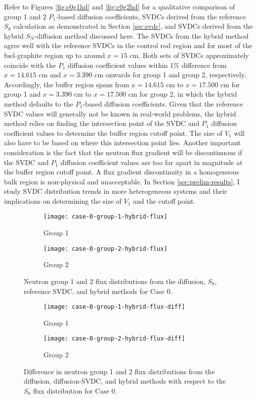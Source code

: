 Refer to Figures \ref{fig:c0g1hd} and \ref{fig:c0g2hd} for a qualitative comparison of group 1 and
2 $P_1$-based diffusion coefficients, \glspl{SVDC} derived from the reference $S_8$ calculation as
demonstrated in Section \ref{sec:svdc}, and \glspl{SVDC} derived from the hybrid $S_N$-diffusion
method discussed here. The \glspl{SVDC} from the hybrid method agree well with the reference
\glspl{SVDC} in the control rod region and for most of the fuel-graphite region up to around
$x=15$ cm. Both sets of \glspl{SVDC} approximately coincide with the $P_1$ diffusion coefficient
values within 1\% difference from $x=14.615$ cm and $x=3.390$ cm onwards for group 1 and
group 2, respectively. Accordingly, the buffer region spans from $x=14.615$ cm to $x=17.500$ cm for
group 1 and $x=3.390$ cm to $x=17.500$ cm for group 2, in which the hybrid method defaults to the
$P_1$-based diffusion coefficients. Given that the reference \gls{SVDC} values will generally not
be known in real-world problems, the hybrid method relies on finding the intersection point of the
\gls{SVDC} and $P_1$ diffusion coefficient values to determine the buffer region cutoff point. The
size of $V_1$ will also have to be based on where this intersection point lies.
Another important consideration is the fact that the neutron flux gradient will be discontinuous if
the \gls{SVDC} and $P_1$ diffusion coefficient values are too far apart in magnitude at the buffer
region cutoff point. A flux gradient discontinuity in a homogeneous bulk region is non-physical and
unacceptable. In Section \ref{sec:prelim-results}, I study \gls{SVDC} distribution trends
in more heterogeneous systems and their implications on determining the size of $V_1$ and
the cutoff point.
%
\begin{figure}[htb!]
  \centering
  \begin{subfigure}[b]{.49\textwidth}
    \centering
    \texttt{[image: case-0-group-1-hybrid-flux]}
    \caption{Group 1}
    \label{fig:c0g1hf}
  \end{subfigure}
  \hfill
  \begin{subfigure}[b]{.49\textwidth}
    \centering
    \texttt{[image: case-0-group-2-hybrid-flux]}
    \caption{Group 2}
    \label{fig:c0g2hf}
  \end{subfigure}
  \caption{Neutron group 1 and 2 flux distributions from the diffusion, $S_8$, reference
  \gls{SVDC}, and hybrid methods for Case 0.}
  \label{fig:c0hf}
  \centering
  \begin{subfigure}[b]{.49\textwidth}
    \centering
    \texttt{[image: case-0-group-1-hybrid-flux-diff]}
    \caption{Group 1}
    \label{fig:c0g1hfdiff}
  \end{subfigure}
  \hfill
  \begin{subfigure}[b]{.49\textwidth}
    \centering
    \texttt{[image: case-0-group-2-hybrid-flux-diff]}
    \caption{Group 2}
    \label{fig:c0g2hfdiff}
  \end{subfigure}
  \caption{Difference in neutron group 1 and 2 flux distributions from the diffusion,
  diffusion-\gls{SVDC}, and hybrid methods with respect to the $S_8$ flux distribution for Case 0.}
  \label{fig:c0hfdiff}
\end{figure}

